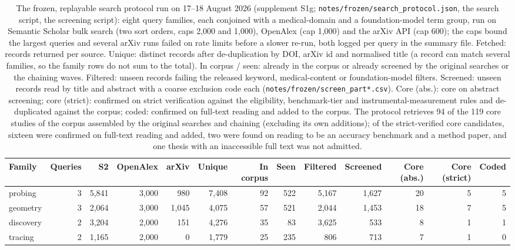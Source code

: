 \begin{table}[!tbp]
\centering\scriptsize\setlength\tabcolsep{3pt}\renewcommand{\arraystretch}{0.95}
\caption{The frozen, replayable search protocol run on 17--18 August 2026 (supplement S1g; \texttt{notes/frozen/search\_protocol.json}, the search script, the screening script): eight query families, each conjoined with a medical-domain and a foundation-model term group, run on Semantic Scholar bulk search (two sort orders, caps 2,000 and 1,000), OpenAlex (cap 1,000) and the arXiv API (cap 600); the caps bound the largest queries and several arXiv runs failed on rate limits before a slower re-run, both logged per query in the summary file. Fetched: records returned per source. Unique: distinct records after de-duplication by DOI, arXiv id and normalised title (a record can match several families, so the family rows do not sum to the total). In corpus / seen: already in the corpus or already screened by the original searches or the chaining waves. Filtered: unseen records failing the released keyword, medical-content or foundation-model filters. Screened: unseen records read by title and abstract with a coarse exclusion code each (\texttt{notes/frozen/screen\_part*.csv}). Core (abs.): core on abstract screening; core (strict): confirmed on strict verification against the eligibility, benchmark-tier and instrumental-measurement rules and de-duplicated against the corpus; coded: confirmed on full-text reading and added to the corpus. The protocol retrieves 94 of the 119 core studies of the corpus assembled by the original searches and chaining (excluding its own additions); of the strict-verified core candidates, sixteen were confirmed on full-text reading and added, two were found on reading to be an accuracy benchmark and a method paper, and one thesis with an inaccessible full text was not admitted.}
\label{tab:frozen}
\begin{tabular}{@{}lrrrrrrrrrrrr@{}}
\toprule
Family & Queries & S2 & OpenAlex & arXiv & Unique & In corpus & Seen & Filtered & Screened & Core (abs.) & Core (strict) & Coded \\
\midrule
probing & 3 & 5,841 & 3,000 & 980 & 7,408 & 92 & 522 & 5,167 & 1,627 & 20 & 5 & 5 \\
geometry & 3 & 2,064 & 3,000 & 1,045 & 4,075 & 57 & 521 & 2,044 & 1,453 & 18 & 7 & 5 \\
discovery & 2 & 3,204 & 2,000 & 151 & 4,276 & 35 & 83 & 3,625 & 533 & 8 & 1 & 1 \\
tracing & 2 & 1,165 & 2,000 & 0 & 1,779 & 25 & 235 & 806 & 713 & 7 & 1 & 0 \\

\end{tabular}
\end{table}

